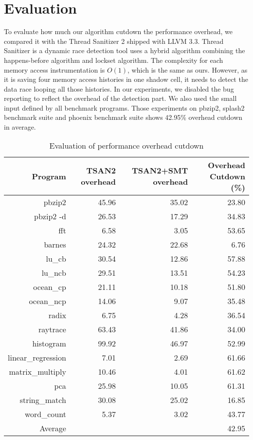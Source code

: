 \section{Evaluation}
To evaluate how much our algorithm cutdown the performance overhead, we compared it with the Thread Sanitizer 2 shipped with LLVM 3.3.
Thread Sanitizer is a dynamic race detection tool uses a hybrid algorithm combining the happens-before algorithm and lockset algorithm.
The complexity for each memory access instrumentation is $O(1)$, which is the same as ours. However, as it is saving four memory access histories
in one shadow cell, it needs to detect the data race looping all those histories. In our experiments, we disabled the bug reporting to 
reflect the overhead of the detection part. We also used the small input defined by all benchmark programs. 
Those experiments on pbzip2, splash2 benchmark suite and phoenix benchmark suite
shows 42.95\% overhead cutdown in average.
\begin{table}[H]
\begin{tabular}{r|r|r|r}
Program & TSAN2 overhead& TSAN2+SMT overhead & Overhead Cutdown (\%) \\\hline
pbzip2 & 45.96 & 35.02 & 23.80 \\\hline
pbzip2 -d & 26.53 & 17.29 & 34.83 \\\hline
fft & 6.58 & 3.05 & 53.65 \\\hline
barnes & 24.32 & 22.68 & 6.76 \\\hline
lu\_cb & 30.54 & 12.86 & 57.88 \\\hline
lu\_ncb & 29.51 & 13.51 & 54.23 \\\hline
ocean\_cp & 21.11 & 10.18 & 51.80 \\\hline
ocean\_ncp & 14.06 & 9.07 & 35.48 \\\hline
radix & 6.75 & 4.28 & 36.54 \\\hline
raytrace & 63.43 & 41.86 & 34.00 \\\hline
histogram & 99.92 & 46.97 & 52.99 \\\hline
linear\_regression & 7.01 & 2.69 & 61.66 \\\hline
matrix\_multiply & 10.46 & 4.01 & 61.62 \\\hline
pca & 25.98 & 10.05 & 61.31 \\\hline
string\_match & 30.08 & 25.02 & 16.85 \\\hline
word\_count & 5.37 & 3.02 & 43.77 \\\hline
Average &&& 42.95
\end{tabular}
\caption{Evaluation of performance overhead cutdown}
\end{table}
